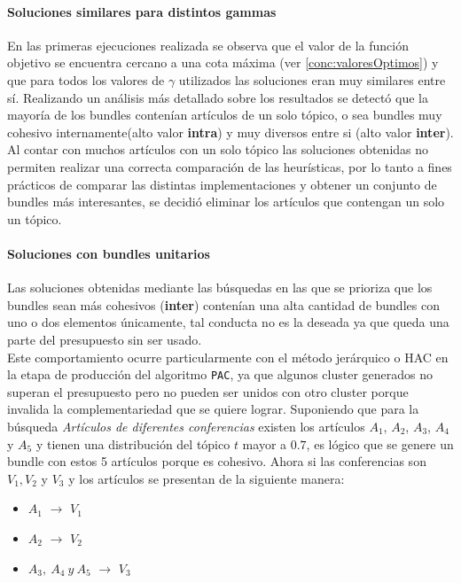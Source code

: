 \paragraph{Soluciones similares para distintos gammas}
En las primeras ejecuciones realizada se observa que el valor de la función objetivo se encuentra cercano a una cota máxima (ver \ref{conc:valoresOptimos}) y que para todos los valores de $\gamma$ utilizados las soluciones eran muy similares entre sí. Realizando un análisis más detallado sobre los resultados se detectó que la mayoría de los bundles contenían artículos de un solo tópico, o sea bundles  muy cohesivo internamente(alto valor \textbf{intra}) y muy diversos entre si (alto valor \textbf{inter}).\\
Al contar con muchos artículos con un solo tópico las soluciones obtenidas no permiten realizar una correcta comparación de las heurísticas, por lo tanto a fines prácticos de comparar las distintas implementaciones y obtener un conjunto de bundles más interesantes, se decidió eliminar los artículos que contengan un solo un tópico.
\paragraph{Soluciones con bundles unitarios}
Las soluciones obtenidas mediante las búsquedas en las que se prioriza que los bundles sean más cohesivos (\textbf{inter}) contenían una alta cantidad de bundles con uno o dos elementos únicamente, tal conducta no es la deseada ya que queda una parte del presupuesto sin ser usado.\\
Este comportamiento ocurre particularmente con el método jerárquico o HAC en la etapa de producción del algoritmo \texttt{PAC}, ya que algunos cluster generados no superan el presupuesto pero no pueden ser unidos con otro cluster porque invalida la complementariedad que se quiere lograr. Suponiendo que para la búsqueda \textit{Artículos de diferentes conferencias} existen los artículos $A_1$, $A_2$, $A_3$, $A_4$ y $A_5$ y tienen una distribución del tópico $t$ mayor a $0.7$, es lógico que se genere un bundle con estos 5 artículos porque es cohesivo. Ahora si las conferencias son $V_1, V_2$ y $V_3$ y los artículos se presentan de la siguiente manera:
\begin{itemize}
	\item $A_1$ $\rightarrow$ $V_1$
	\item $A_2$ $\rightarrow$ $V_2$
	\item $A_3,\ A_4\ y\ A_5$ $\rightarrow$ $V_3$
\end{itemize} 

